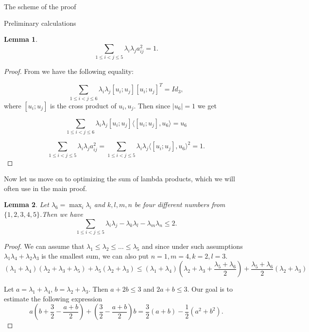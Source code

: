 \documentclass[12pt]{article}
\newtheorem{lemma}{Lemma}[section]
\begin{document}
\begin{section}{The scheme of the proof}
\begin{section}{Preliminary calculations}
    \begin{lemma}
    \label{id-cor}
        $$
            \sum_{1\leq i<j\leq 5} \lambda_{i}\lambda_{j}a_{ij}^2= 1.
        $$
    \end{lemma}
    
    \begin{proof}
        From \cite{g-ivanov} we have the following equality:

        $$
            \sum_{1\leq i<j\leq 6}\lambda_{i}\lambda_{j}[u_{i}; u_{j}][u_{i}; u_{j}]^{T} = Id_{3},
        $$
        where $[u_{i}; u_{j}]$ is the cross product of $u_{i},u_{j}$.
        Then since $|u_{6}|=1$ we get

        $$
            \sum_{1\leq i<j\leq 6}\lambda_{i}\lambda_{j}[u_{i}; u_{j}]\langle[u_{i}; u_{j}], u_{6} \rangle = u_{6}
        $$

        $$
         \sum_{1\leq i<j\leq 5} \lambda_{i}\lambda_{j}a_{ij}^2 = \sum_{1\leq i<j\leq 5}\lambda_{i}\lambda_{j}\langle[u_{i}; u_{j}], u_{6} \rangle ^{2}= 1.
        $$
        
    \end{proof}
    
    Now let us move on to optimizing the sum of lambda products, which we will often use in the main proof. 
    
   
    \begin{lemma}
    \label{lemma-2}
        Let $\lambda_{6} = \max_{i}\lambda_{i}$ and $k,l,m,n$ be four different  numbers from $\{1,2,3,4,5\}$.Then we have 
        $$
            \sum_{1\leq i<j\leq 5}\lambda_{i}\lambda_{j} - \lambda_{k}\lambda_{l} - \lambda_{m}\lambda_{n}\leq 2.
        $$
    \end{lemma}
    
    \begin{proof}
        We can assume that $\lambda_{1}\leq \lambda_{2}\leq \ldots \leq \lambda_{5}$ and since under such  assumptions $\lambda_{1}\lambda_{4} + \lambda_{2}\lambda_{3}$ is the smallest sum, we can also put $n=1,m=4,k=2,l=3$. 
         $$
            (\lambda_{1} + \lambda_{4})(\lambda_{2}+\lambda_{3} + \lambda_{5}) + \lambda_{5}(\lambda_{2} + \lambda_{3}) \leq (\lambda_{1} + \lambda_{4})\left(\lambda_{2}+\lambda_{3} + \frac{\lambda_{5}+\lambda_{6}}{2}\right) + \frac{\lambda_{5}+\lambda_{6}}{2}(\lambda_{2} + \lambda_{3})  
    $$

    Let $a = \lambda_{1} + \lambda_{4}$, $b = \lambda_{2} + \lambda_{3}$. Then $a+2b\leq 3$ and $2a+b\leq 3$. Our goal is to estimate the following expression
    $$
        a\left(b+\frac{3}{2} - \frac{a+b}{2}\right) + \left(\frac{3}{2} - \frac{a+b}{2}\right)b = \frac{3}{2}(a+b) - \frac{1}{2}(a^{2}+b^{2}).
    $$


\end{proof}
\end{section}
\end{section}
\end{document}
